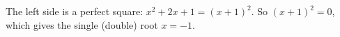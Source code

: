 The left side is a perfect square: $x^2+2x+1=(x+1)^2$. So $(x+1)^2=0$, which gives the single (double) root $\boxed{x=-1}$.
